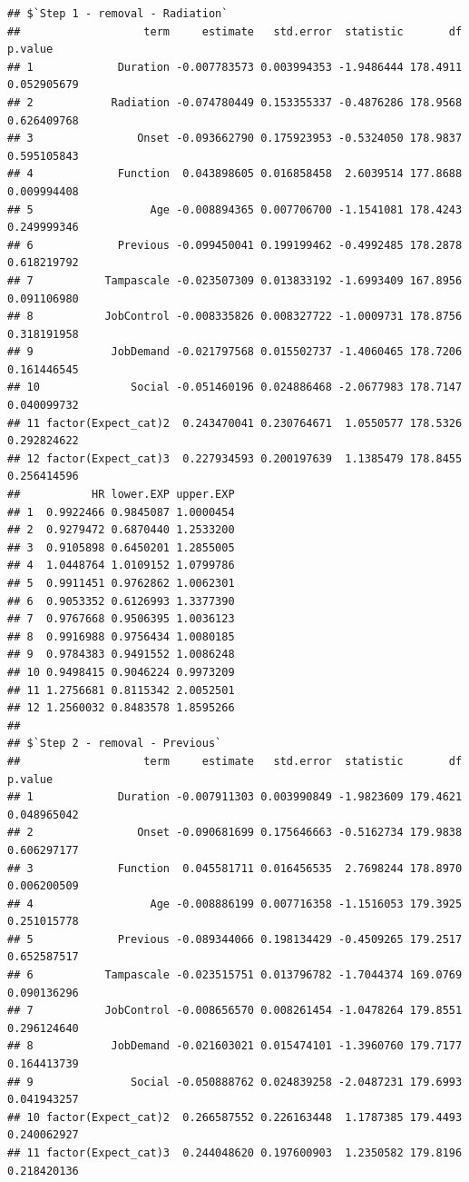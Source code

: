 \documentclass[
]{book}
\begin{document}
\begin{verbatim}
## $`Step 1 - removal - Radiation`
##                   term     estimate   std.error  statistic       df     p.value
## 1             Duration -0.007783573 0.003994353 -1.9486444 178.4911 0.052905679
## 2            Radiation -0.074780449 0.153355337 -0.4876286 178.9568 0.626409768
## 3                Onset -0.093662790 0.175923953 -0.5324050 178.9837 0.595105843
## 4             Function  0.043898605 0.016858458  2.6039514 177.8688 0.009994408
## 5                  Age -0.008894365 0.007706700 -1.1541081 178.4243 0.249999346
## 6             Previous -0.099450041 0.199199462 -0.4992485 178.2878 0.618219792
## 7           Tampascale -0.023507309 0.013833192 -1.6993409 167.8956 0.091106980
## 8           JobControl -0.008335826 0.008327722 -1.0009731 178.8756 0.318191958
## 9            JobDemand -0.021797568 0.015502737 -1.4060465 178.7206 0.161446545
## 10              Social -0.051460196 0.024886468 -2.0677983 178.7147 0.040099732
## 11 factor(Expect_cat)2  0.243470041 0.230764671  1.0550577 178.5326 0.292824622
## 12 factor(Expect_cat)3  0.227934593 0.200197639  1.1385479 178.8455 0.256414596
##           HR lower.EXP upper.EXP
## 1  0.9922466 0.9845087 1.0000454
## 2  0.9279472 0.6870440 1.2533200
## 3  0.9105898 0.6450201 1.2855005
## 4  1.0448764 1.0109152 1.0799786
## 5  0.9911451 0.9762862 1.0062301
## 6  0.9053352 0.6126993 1.3377390
## 7  0.9767668 0.9506395 1.0036123
## 8  0.9916988 0.9756434 1.0080185
## 9  0.9784383 0.9491552 1.0086248
## 10 0.9498415 0.9046224 0.9973209
## 11 1.2756681 0.8115342 2.0052501
## 12 1.2560032 0.8483578 1.8595266
## 
## $`Step 2 - removal - Previous`
##                   term     estimate   std.error  statistic       df     p.value
## 1             Duration -0.007911303 0.003990849 -1.9823609 179.4621 0.048965042
## 2                Onset -0.090681699 0.175646663 -0.5162734 179.9838 0.606297177
## 3             Function  0.045581711 0.016456535  2.7698244 178.8970 0.006200509
## 4                  Age -0.008886199 0.007716358 -1.1516053 179.3925 0.251015778
## 5             Previous -0.089344066 0.198134429 -0.4509265 179.2517 0.652587517
## 6           Tampascale -0.023515751 0.013796782 -1.7044374 169.0769 0.090136296
## 7           JobControl -0.008656570 0.008261454 -1.0478264 179.8551 0.296124640
## 8            JobDemand -0.021603021 0.015474101 -1.3960760 179.7177 0.164413739
## 9               Social -0.050888762 0.024839258 -2.0487231 179.6993 0.041943257
## 10 factor(Expect_cat)2  0.266587552 0.226163448  1.1787385 179.4493 0.240062927
## 11 factor(Expect_cat)3  0.244048620 0.197600903  1.2350582 179.8196 0.218420136

\end{verbatim}
\end{document}
